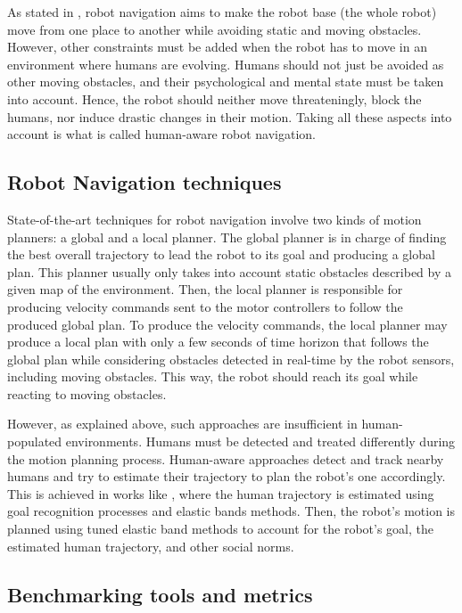 As stated in \cite{thesisBuisan21}, robot navigation aims to make the robot base (the whole robot) move from one place to another while avoiding static and moving obstacles. However, other constraints must be added when the robot has to move in an environment where humans are evolving. 
Humans should not just be avoided as other moving obstacles, and their psychological and mental state must be taken into account. Hence, the robot should neither move threateningly, block the humans, nor induce drastic changes in their motion. Taking all these aspects into account is what is called human-aware robot navigation.

\subsection{Robot Navigation techniques}

State-of-the-art techniques for robot navigation involve two kinds of motion planners: a global and a local planner. The global planner is in charge of finding the best overall trajectory to lead the robot to its goal and producing a global plan. This planner usually only takes into account static obstacles described by a given map of the environment. Then, the local planner is responsible for producing velocity commands sent to the motor controllers to follow the produced global plan. To produce the velocity commands, the local planner may produce a local plan with only a few seconds of time horizon that follows the global plan while considering obstacles detected in real-time by the robot sensors, including moving obstacles. This way, the robot should reach its goal while reacting to moving obstacles. 

However, as explained above, such approaches are insufficient in human-populated environments. Humans must be detected and treated differently during the motion planning process. Human-aware approaches detect and track nearby humans and try to estimate their trajectory to plan the robot's one accordingly. This is achieved in works like \cite{singamaneni2021human}, where the human trajectory is estimated using goal recognition processes and elastic bands methods. Then, the robot's motion is planned using tuned elastic band methods to account for the robot's goal, the estimated human trajectory, and other social norms.   

\subsection{Benchmarking tools and metrics}

